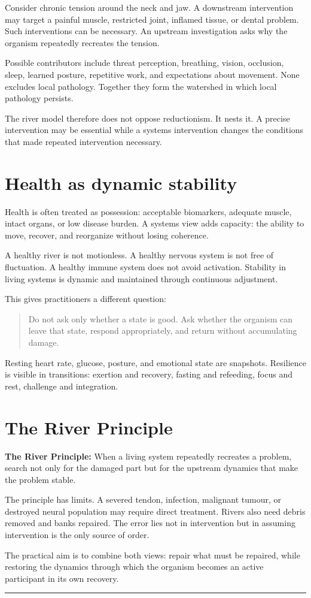 Consider chronic tension around the neck and jaw. A downstream intervention may target a painful muscle, restricted joint, inflamed tissue, or dental problem. Such interventions can be necessary. An upstream investigation asks why the organism repeatedly recreates the tension.

Possible contributors include threat perception, breathing, vision, occlusion, sleep, learned posture, repetitive work, and expectations about movement. None excludes local pathology. Together they form the watershed in which local pathology persists.

The river model therefore does not oppose reductionism. It nests it. A precise intervention may be essential while a systems intervention changes the conditions that made repeated intervention necessary.

\section{Health as dynamic stability}

Health is often treated as possession: acceptable biomarkers, adequate muscle, intact organs, or low disease burden. A systems view adds capacity: the ability to move, recover, and reorganize without losing coherence.

A healthy river is not motionless. A healthy nervous system is not free of fluctuation. A healthy immune system does not avoid activation. Stability in living systems is dynamic and maintained through continuous adjustment.

This gives practitioners a different question:

\begin{quote}
Do not ask only whether a state is good. Ask whether the organism can leave that state, respond appropriately, and return without accumulating damage.
\end{quote}

Resting heart rate, glucose, posture, and emotional state are snapshots. Resilience is visible in transitions: exertion and recovery, fasting and refeeding, focus and rest, challenge and integration.

\section{The River Principle}

\textbf{The River Principle:} When a living system repeatedly recreates a problem, search not only for the damaged part but for the upstream dynamics that make the problem stable.

The principle has limits. A severed tendon, infection, malignant tumour, or destroyed neural population may require direct treatment. Rivers also need debris removed and banks repaired. The error lies not in intervention but in assuming intervention is the only source of order.

The practical aim is to combine both views: repair what must be repaired, while restoring the dynamics through which the organism becomes an active participant in its own recovery.

\begin{center}\rule{0.5\linewidth}{0.5pt}\end{center}
